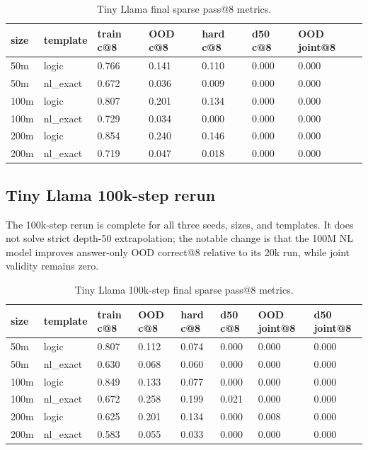 \documentclass[10pt]{article}
\begin{document}
\begin{table}[H]
\centering
\small
\begin{tabular}{lllllll}
\toprule
size & template & train c@8 & OOD c@8 & hard c@8 & d50 c@8 & OOD joint@8 \\
\midrule
50m & logic & 0.766 & 0.141 & 0.110 & 0.000 & 0.000 \\
50m & nl\_exact & 0.672 & 0.036 & 0.009 & 0.000 & 0.000 \\
100m & logic & 0.807 & 0.201 & 0.134 & 0.000 & 0.000 \\
100m & nl\_exact & 0.729 & 0.034 & 0.000 & 0.000 & 0.000 \\
200m & logic & 0.854 & 0.240 & 0.146 & 0.000 & 0.000 \\
200m & nl\_exact & 0.719 & 0.047 & 0.018 & 0.000 & 0.000 \\
\bottomrule
\end{tabular}
\caption{Tiny Llama final sparse pass@8 metrics.}
\end{table}

\subsection{Tiny Llama 100k-step rerun}
The 100k-step rerun is complete for all three seeds, sizes, and templates. It does not solve strict depth-50 extrapolation; the notable change is that the 100M NL model improves answer-only OOD correct@8 relative to its 20k run, while joint validity remains zero.

\begin{table}[H]
\centering
\small
\begin{tabular}{llllllll}
\toprule
size & template & train c@8 & OOD c@8 & hard c@8 & d50 c@8 & OOD joint@8 & d50 joint@8 \\
\midrule
50m & logic & 0.807 & 0.112 & 0.074 & 0.000 & 0.000 & 0.000 \\
50m & nl\_exact & 0.630 & 0.068 & 0.060 & 0.000 & 0.000 & 0.000 \\
100m & logic & 0.849 & 0.133 & 0.077 & 0.000 & 0.000 & 0.000 \\
100m & nl\_exact & 0.672 & 0.258 & 0.199 & 0.021 & 0.000 & 0.000 \\
200m & logic & 0.625 & 0.201 & 0.134 & 0.000 & 0.008 & 0.000 \\
200m & nl\_exact & 0.583 & 0.055 & 0.033 & 0.000 & 0.000 & 0.000 \\
\bottomrule
\end{tabular}
\caption{Tiny Llama 100k-step final sparse pass@8 metrics.}
\end{table}
\end{document}
